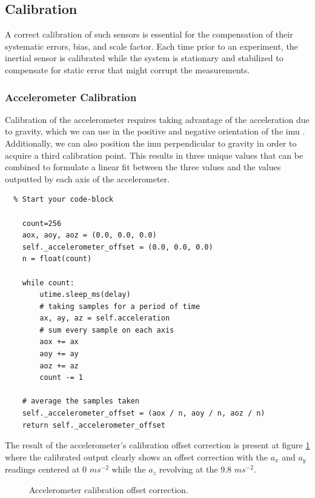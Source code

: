 \subsection{Calibration}
\label{sub:calibration}

A correct calibration of such sensors is essential for the compensation of their systematic errors, bias, and scale factor. Each time prior to an experiment, the inertial sensor is calibrated while the system is stationary and stabilized to compensate for static error that might corrupt the measurements.

\subsubsection{Accelerometer Calibration}

Calibration of the accelerometer requires taking advantage of the acceleration due to gravity, which we can use in the positive and negative orientation of the \acrshort{imu} \cite{won2009triaxial}. Additionally, we can also position the \acrshort{imu} perpendicular to gravity in order to acquire a third calibration point. This results in three unique values that can be combined to formulate a linear fit between the three values and the values outputted by each axis of the accelerometer.

\lstset{language=Python}
\begin{lstlisting}  % Start your code-block

    count=256
    aox, aoy, aoz = (0.0, 0.0, 0.0)
    self._accelerometer_offset = (0.0, 0.0, 0.0)
    n = float(count)

    while count:
        utime.sleep_ms(delay)
        # taking samples for a period of time
        ax, ay, az = self.acceleration
        # sum every sample on each axis
        aox += ax
        aoy += ay
        aoz += az 
        count -= 1

    # average the samples taken
    self._accelerometer_offset = (aox / n, aoy / n, aoz / n)
    return self._accelerometer_offset
\end{lstlisting}

The result of the accelerometer's calibration offset correction is present at figure \ref{fig:accelerometer_calibration} where the calibrated output clearly shows an offset correction with the $a_x$ and $a_y$ readings centered at 0 $ms^{-2}$ while the $a_z$ revolving at the 9.8 $ms^{-2}$.

\begin{figure}[!h]
    \centering
    \resizebox{0.8\linewidth}{!}{}
    \caption{Accelerometer calibration offset correction.}
    \label{fig:accelerometer_calibration}
\end{figure}

